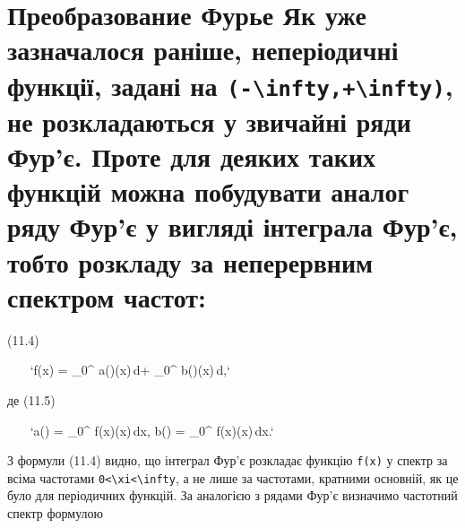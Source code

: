 \documentclass[
  ukrainian,
]{article}
\begin{document}
\section{\texorpdfstring{Преобразование Фурье Як уже зазначалося раніше,
неперіодичні функції, задані на
\texttt{(-\textbackslash{}infty,+\textbackslash{}infty)}, не
розкладаються у звичайні ряди Фур'є. Проте для деяких таких функцій
можна побудувати аналог ряду Фур'є у вигляді інтеграла Фур'є, тобто
розкладу за неперервним спектром
частот:}{Преобразование Фурье Як уже зазначалося раніше, неперіодичні функції, задані на (-\textbackslash infty,+\textbackslash infty), не розкладаються у звичайні ряди Фур'є. Проте для деяких таких функцій можна побудувати аналог ряду Фур'є у вигляді інтеграла Фур'є, тобто розкладу за неперервним спектром частот:}}\label{ux43fux440ux435ux43eux431ux440ux430ux437ux43eux432ux430ux43dux438ux435-ux444ux443ux440ux44cux435-ux44fux43a-ux443ux436ux435-ux437ux430ux437ux43dux430ux447ux430ux43bux43eux441ux44f-ux440ux430ux43dux456ux448ux435-ux43dux435ux43fux435ux440ux456ux43eux434ux438ux447ux43dux456-ux444ux443ux43dux43aux446ux456ux457-ux437ux430ux434ux430ux43dux456-ux43dux430--inftyinfty-ux43dux435-ux440ux43eux437ux43aux43bux430ux434ux430ux44eux442ux44cux441ux44f-ux443-ux437ux432ux438ux447ux430ux439ux43dux456-ux440ux44fux434ux438-ux444ux443ux440ux454.-ux43fux440ux43eux442ux435-ux434ux43bux44f-ux434ux435ux44fux43aux438ux445-ux442ux430ux43aux438ux445-ux444ux443ux43dux43aux446ux456ux439-ux43cux43eux436ux43dux430-ux43fux43eux431ux443ux434ux443ux432ux430ux442ux438-ux430ux43dux430ux43bux43eux433-ux440ux44fux434ux443-ux444ux443ux440ux454-ux443-ux432ux438ux433ux43bux44fux434ux456-ux456ux43dux442ux435ux433ux440ux430ux43bux430-ux444ux443ux440ux454-ux442ux43eux431ux442ux43e-ux440ux43eux437ux43aux43bux430ux434ux443-ux437ux430-ux43dux435ux43fux435ux440ux435ux440ux432ux43dux438ux43c-ux441ux43fux435ux43aux442ux440ux43eux43c-ux447ux430ux441ux442ux43eux442}

(11.4)

~~~
`f(x) = \int_{0}^{\infty} a(\xi)\cos(\xi x)\,d\xi + \int_{0}^{\infty} b(\xi)\sin(\xi x)\,d\xi,`
~~~

де (11.5)

~~~
`a(\xi) = \int_{0}^{\infty} f(x)\cos(\xi x)\,dx, \qquad b(\xi) = \int_{0}^{\infty} f(x)\sin(\xi x)\,dx.`
~~~

З формули (11.4) видно, що інтеграл Фур'є розкладає функцію
\texttt{f(x)} у спектр за всіма частотами
\texttt{0\textless{}\textbackslash{}xi\textless{}\textbackslash{}infty},
а не лише за частотами, кратними основній, як це було для періодичних
функцій. За аналогією з рядами Фур'є визначимо частотний спектр формулою
\end{document}
